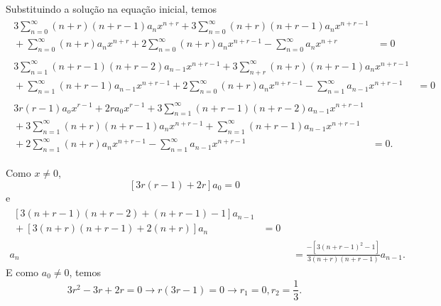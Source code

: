\documentclass[a4paper,12pt, leqno, answers]{exam}
\begin{document}
\begin{questions}
\begin{solution}
        Substituindo a solu\c{c}\~{a}o na equa\c{c}\~{a}o inicial, temos
        \begin{align*}
            \begin{split}
                3 \sum_{n = 0}^\infty \left( n + r \right) \left( n + r - 1 \right) a_n x^{n + r} + 3 \sum_{n = 0}^\infty \left( n + r \right) \left( n + r - 1 \right) a_n x^{n + r - 1} \\ {}+ \sum_{n = 0}^\infty \left( n + r \right) a_n x^{n + r} + 2 \sum_{n = 0}^\infty \left( n + r \right) a_n x^{n + r - 1} - \sum_{n = 0}^\infty a_n x^{n + r} &= 0
            \end{split} \\
            \begin{split}
                3 \sum_{n = 1}^\infty \left( n + r - 1 \right) \left( n + r - 2 \right) a_{n - 1} x^{n + r - 1} + 3 \sum_{n + r}^\infty \left( n + r \right) \left( n + r - 1 \right) a_n x^{n + r - 1} \\ {}+ \sum_{n = 1}^\infty \left( n + r - 1 \right) a_{n - 1} x^{n + r - 1} + 2 \sum_{n = 0}^\infty \left( n + r \right) a_n x^{n + r - 1} - \sum_{n = 1}^\infty a_{n - 1} x^{n + r - 1} &= 0
            \end{split} \\
            \begin{split}
                3 r \left( r - 1 \right) a_o x^{r - 1} + 2 r a_0 x^{r - 1} + 3 \sum_{n = 1}^\infty \left( n + r - 1 \right) \left( n + r - 2 \right) a_{n - 1} x^{n + r - 1} \\ {}+ 3 \sum_{n = 1}^\infty \left( n + r \right) \left( n + r - 1 \right) a_n x^{n + r - 1} + \sum_{n = 1}^\infty \left( n + r - 1 \right) a_{n - 1} x^{n + r -1} \\ {}+ 2 \sum_{n = 1}^\infty \left( n + r \right) a_n x^{n + r - 1} - \sum_{n = 1}^\infty a_{n - 1} x^{n + r - 1} &= 0.
            \end{split}
        \end{align*}

        Como $x \neq 0$,
        \[
        \left[ 3 r \left( r - 1 \right) + 2r \right] a_0 = 0
        \]
        e
        \begin{align*}
            \begin{split}
                \left[ 3 \left( n + r - 1 \right) \left( n + r - 2 \right) + \left( n + r - 1 \right) - 1 \right] a_{n - 1} \\ {}+ \left[ 3 \left( n + r \right) \left( n + r - 1 \right) + 2 \left( n + r \right) \right] a_n &= 0
            \end{split} \\
            a_n &= \frac{- \left[ 3 \left( n + r - 1 \right)^2 - 1 \right]}{3 \left( n + r \right) \left( n + r - 1 \right)} a_{n - 1}.
        \end{align*}
        E como $a_0 \neq 0$, temos
        \[
        3 r^2 - 3 r + 2 r = 0 \rightarrow r\left( 3r - 1 \right) = 0 \rightarrow r_1 = 0, r_2 = \frac{1}{3}.
        \]
        

\end{solution}
\end{questions}
\end{document}
